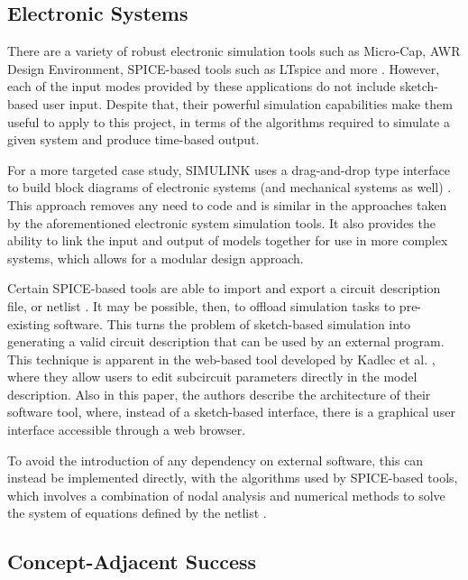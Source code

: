 \documentclass{article}
\begin{document}
\subsection{Electronic Systems}
\label{subsec:Electronic Systems}

There are a variety of robust electronic simulation tools such as Micro-Cap, AWR Design Environment, \gls{SPICE}-based
tools such as LTspice and more \cite{web:micro-cap,web:awrde,web:ltspice}. However, each of the input modes provided by
these applications do not include sketch-based user input. Despite that, their powerful simulation capabilities make them
useful to apply to this project, in terms of the algorithms required to simulate a given system and produce time-based output.

For a more targeted case study, SIMULINK uses a drag-and-drop type interface to build block diagrams of electronic systems 
(and mechanical systems as well) \cite{web:simulink}. This approach removes any need to code and is similar in the approaches
taken by the aforementioned electronic system simulation tools. It also provides the ability to link the input and output of 
models together for use in more complex systems, which allows for a modular design approach.

Certain \gls{SPICE}-based tools are able to import and export a circuit description file, or netlist \cite{web:cadence-pspice}. It may be possible, 
then, to offload simulation tasks to pre-existing software. This turns the problem of sketch-based simulation into generating a 
valid circuit description that can be used by an external program. This technique is apparent in the web-based
tool developed by Kadlec et al. \cite{5432817}, where they allow users to edit subcircuit parameters directly in the model description. 
Also in this paper, the authors describe the architecture of their software tool, where, instead of a sketch-based interface, there is a 
graphical user interface accessible through a web browser.

To avoid the introduction of any dependency on external software, this can instead be implemented directly, with the algorithms used 
by \gls{SPICE}-based tools, which involves a combination of nodal analysis and numerical methods to solve the system of equations defined
by the netlist \cite{web:spice-algorithm,book:circuit-simulation}. 

\subsection{Concept-Adjacent Success}
\label{subsec:Concept-Adjacent Success}
\end{document}
